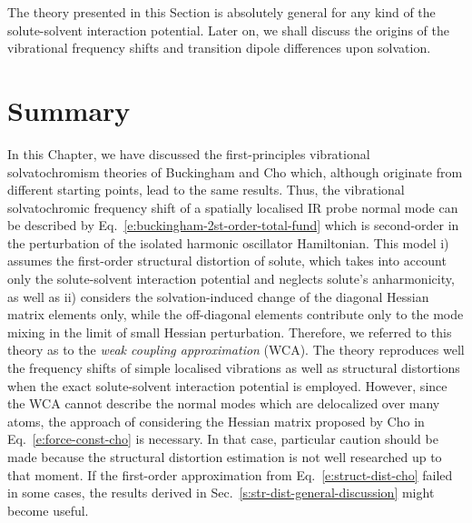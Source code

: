 \documentclass[b5paper,oneside,fleqn,11pt]{book}
\begin{document}
\begin{refsection}
The theory presented in this Section is absolutely general 
for any kind of the solute\hyp{}solvent
interaction potential. Later on, we shall discuss the origins of the
vibrational frequency shifts and transition dipole differences
upon solvation.


\section{Summary}

In this Chapter, we have discussed the first\hyp{}principles
vibrational solvatochromism theories of Buckingham and Cho which,
although originate from different starting points, lead to the same results.
Thus, the vibrational solvatochromic frequency shift of a spatially localised 
IR probe normal mode can be described by Eq.~\eqref{e:buckingham-2st-order-total-fund}
which is second\hyp{}order in the perturbation of the isolated harmonic oscillator Hamiltonian.
This model i) assumes the first\hyp{}order structural distortion of solute, which takes 
into account only the solute\hyp{}solvent interaction potential and neglects
solute's anharmonicity, as well as ii) considers the solvation\hyp{}induced change of the diagonal
Hessian matrix elements only, while the off\hyp{}diagonal elements
contribute only to the mode mixing in the limit of small Hessian perturbation. 
Therefore, we referred to this theory
as to the \emph{weak coupling approximation} (WCA). The theory reproduces well the frequency shifts of
simple localised vibrations as well as structural distortions
when the exact solute\hyp{}solvent interaction potential
is employed. However, since the WCA cannot describe the normal modes
which are delocalized over many atoms, the approach of considering
the Hessian matrix proposed by Cho in Eq.~\eqref{e:force-const-cho} is necessary. 
In that case, particular caution should be made because the structural
distortion estimation is not well researched up to that moment. If the
first-order approximation from Eq.~\eqref{e:struct-dist-cho} failed in some cases, the results 
derived in Sec.~\ref{s:str-dist-general-discussion} might become useful.

\printbibliography[heading=subbibintoc,title={References}]
\end{refsection}
\end{document}
